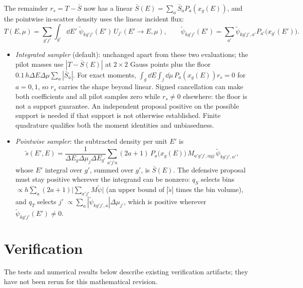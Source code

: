 \documentclass[11pt]{article}
\newcommand{\tpsi}{\tilde\psi}
\newcommand{\Sbar}{\bar S}
\begin{document}
The remainder $r_s = T - \Sbar$ now has a linear $\Sbar(E) = \sum_a\Sbar_aP_a(x_g(E))$,
and the pointwise in-scatter density uses the linear incident flux:
\begin{equation}
  T(E,\mu) = \sum_{g'j'}\int_{g'}\dd E'\;
  \tpsi_{kg'j'}(E')\,U_{j'}(E'\!\to E,\mu),\qquad
  \tpsi_{kg'j'}(E') = \sum_{a'}\tpsi_{kg'j',a'}P_{a'}\big(x_{g'}(E')\big).
\end{equation}
\begin{itemize}
  \item \emph{Integrated sampler} (default): unchanged apart from these two
  evaluations; the pilot masses use $|T-\Sbar(E)|$ at $2\times2$ Gauss points plus the
  floor $0.1\,h\Delta E\Delta\mu\sum_a|\Sbar_a|$. For exact moments,
  $\int_g\dd E\int_j\dd\mu\,P_a(x_g(E))r_s=0$ for $a=0,1$, so $r_s$ carries
  the shape beyond linear. Signed cancellation can make both coefficients and
  all pilot samples zero while $r_s\ne0$ elsewhere: the floor is not a support
  guarantee. An independent proposal positive on the possible support is needed
  if that support is not otherwise established. Finite quadrature qualifies
  both the moment identities and unbiasedness.
  \item \emph{Pointwise sampler}: the subtracted density per unit $E'$ is
  \begin{equation}
    \tilde s(E',E) = \frac{1}{\Delta E_g\Delta\mu_j\Delta E_{g'}}
    \sum_{a'j'a}(2a+1)\,P_a\big(x_g(E)\big)\,M_{a'g'j',agj}\,\tpsi_{kg'j',a'} ,
  \end{equation}
  whose $E'$ integral over $g'$, summed over $g'$, is $\Sbar(E)$. The defensive proposal
  must stay positive wherever the integrand can be nonzero: $q_S$ selects bins
  $\propto h\sum_a(2a+1)\big|\sum_{a'j'}M\tpsi\big|$ (an upper bound of $|\tilde s|$
  times the bin volume), and $q_T$ selects $j'$ $\propto\sum_a|\tpsi_{kg'j',a}|\Delta\mu_{j'}$,
  which is positive wherever $\tpsi_{kg'j'}(E')\ne 0$.
\end{itemize}

\section{Verification}

The tests and numerical results below describe existing verification artifacts;
they have not been rerun for this mathematical revision.
\end{document}
